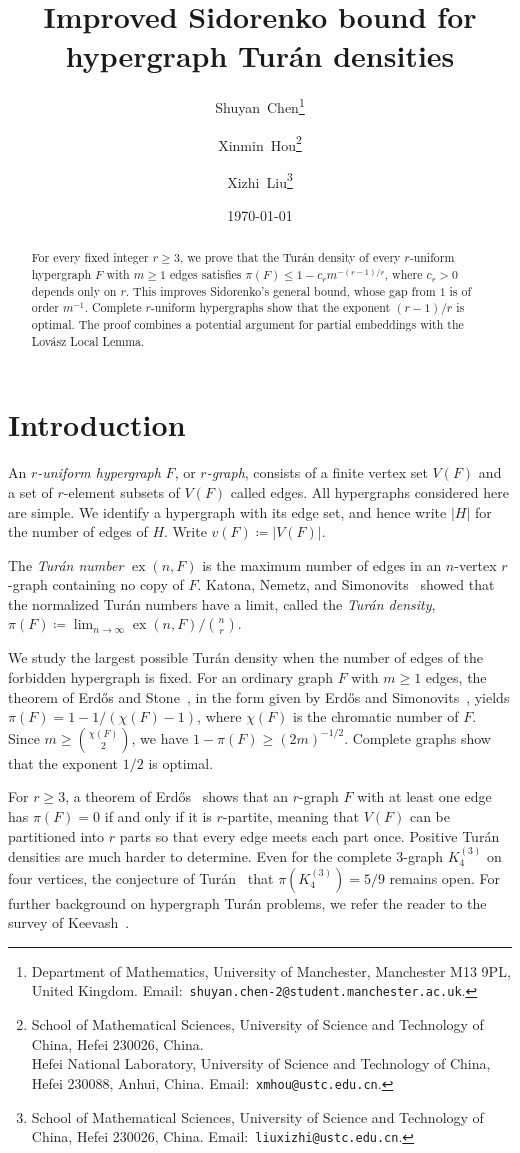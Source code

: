 \documentclass[10pt]{article}
\title{\Large\bfseries Improved Sidorenko bound for hypergraph Tur\'an densities}
\author{%
Shuyan~Chen\thanks{\scriptsize Department of Mathematics, University of Manchester, Manchester M13 9PL, United Kingdom. Email:~\texttt{shuyan.chen-2@student.manchester.ac.uk}.}
\and
Xinmin~Hou\thanks{\scriptsize School of Mathematical Sciences, University of Science and Technology of China, Hefei 230026, China. \\
Hefei National Laboratory,
University of Science and Technology of China, Hefei 230088, Anhui, China. Email:~\texttt{xmhou@ustc.edu.cn}.}
\and
Xizhi~Liu\thanks{\scriptsize School of Mathematical Sciences, University of Science and Technology of China, Hefei 230026, China. Email:~\texttt{liuxizhi@ustc.edu.cn}.}}
\date{\today}
\numberwithin{equation}{section}
\DeclareMathOperator{\ex}{ex}
\begin{document}
\maketitle

\begin{abstract}
For every fixed integer $r\ge3$, we prove that the Tur\'an density of every $r$-uniform hypergraph $F$ with $m\ge1$ edges satisfies $\pi(F)\le1-c_rm^{-(r-1)/r}$, where $c_r>0$ depends only on $r$. This improves Sidorenko's general bound, whose gap from $1$ is of order $m^{-1}$. Complete $r$-uniform hypergraphs show that the exponent $(r-1)/r$ is optimal. The proof combines a potential argument for partial embeddings with the Lov\'asz Local Lemma.
\end{abstract}

\section{Introduction}

An \emph{$r$-uniform hypergraph} $F$, or \emph{$r$-graph}, consists of a finite vertex set $V(F)$ and a set of $r$-element subsets of $V(F)$ called edges. All hypergraphs considered here are simple. We identify a hypergraph with its edge set, and hence write $|H|$ for the number of edges of $H$. Write $v(F)\coloneqq|V(F)|$.

The \emph{Tur\'an number} $\ex(n,F)$ is the maximum number of edges in an $n$-vertex $r$-graph containing no copy of $F$. Katona, Nemetz, and Simonovits~\cite{KNS64} showed that the normalized Tur\'an numbers have a limit, called the \emph{Tur\'an density}, $\pi(F)\coloneqq\lim_{n\to\infty}{\ex(n,F)}/{\binom nr}$.

We study the largest possible Tur\'an density when the number of edges of the forbidden hypergraph is fixed. For an ordinary graph $F$ with $m\ge1$ edges, the theorem of Erd\H{o}s and Stone~\cite{ErdosStone}, in the form given by Erd\H{o}s and Simonovits~\cite{ErdosSimonovits}, yields $\pi(F)=1-1/(\chi(F)-1)$, where $\chi(F)$ is the chromatic number of $F$. Since $m\ge\binom{\chi(F)}2$, we have $1-\pi(F)\ge(2m)^{-1/2}$. Complete graphs show that the exponent $1/2$ is optimal.

For $r\ge3$, a theorem of Erd\H{o}s~\cite{Erdos64} shows that an $r$-graph $F$ with at least one edge has $\pi(F)=0$ if and only if it is $r$-partite, meaning that $V(F)$ can be partitioned into $r$ parts so that every edge meets each part once. Positive Tur\'an densities are much harder to determine. Even for the complete $3$-graph $K_4^{(3)}$ on four vertices, the conjecture of Tur\'an~\cite{Turan41} that $\pi(K_4^{(3)})=5/9$ remains open. For further background on hypergraph Tur\'an problems, we refer the reader to the survey of Keevash~\cite{Keevash11}.
\end{document}
